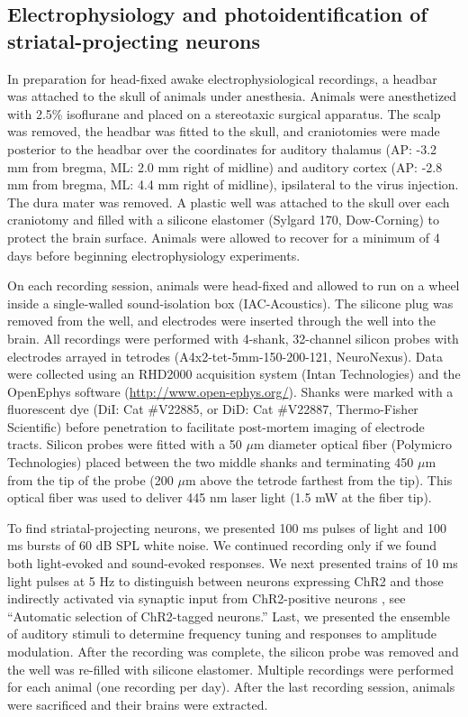 \subsection{Electrophysiology and photoidentification of striatal-projecting neurons}
%
In preparation for head-fixed awake electrophysiological recordings, a headbar was attached to the skull of animals under anesthesia.
%
Animals were anesthetized with 2.5\% isoflurane and placed on a stereotaxic surgical apparatus. 
%
The scalp was removed, the headbar was fitted to the skull, and craniotomies were made posterior to the headbar over the coordinates for auditory thalamus (AP: -3.2 mm from bregma, ML: 2.0 mm right of midline) and auditory cortex (AP: -2.8 mm from bregma, ML: 4.4 mm right of midline), ipsilateral to the virus injection.
%
The dura mater was removed. 
%
A plastic well was attached to the skull over each craniotomy and filled with a silicone elastomer (Sylgard 170, Dow-Corning) to protect the brain surface. 
%
Animals were allowed to recover for a minimum of 4 days before beginning electrophysiology experiments.

On each recording session, animals were head-fixed and allowed to run on a wheel inside a single-walled sound-isolation box (IAC-Acoustics). 
%
The silicone plug was removed from the well, and electrodes were inserted through the well into the brain. 
%
All recordings were performed with 4-shank, 32-channel silicon probes with electrodes arrayed in tetrodes (A4x2-tet-5mm-150-200-121, NeuroNexus). 
%
Data were collected using an RHD2000 acquisition system (Intan Technologies) and the OpenEphys software (\url{http://www.open-ephys.org/}).
%
Shanks were marked with a fluorescent dye (DiI: Cat \#V22885, or DiD: Cat \#V22887, Thermo-Fisher Scientific) before penetration to facilitate post-mortem imaging of electrode tracts. 
%
Silicon probes were fitted with a 50 $\mu$m diameter optical fiber (Polymicro Technologies) placed between the two middle shanks and terminating 450 $\mu$m from the tip of the probe (200 $\mu$m above the tetrode farthest from the tip). 
%
This optical fiber was used to deliver 445 nm laser light (1.5 mW at the fiber tip).

To find striatal-projecting neurons, we presented 100 ms pulses of light and 100 ms bursts of 60 dB SPL white noise. 
%
We continued recording only if we found both light-evoked and sound-evoked responses. 
%
We next presented trains of 10 ms light pulses at 5 Hz to distinguish between neurons expressing ChR2 and those indirectly activated via synaptic input from ChR2-positive neurons \citep{Lima2009}, see ``Automatic selection of ChR2-tagged neurons.''
%
Last, we presented the ensemble of auditory stimuli to determine frequency tuning and responses to amplitude modulation. 
%
After the recording was complete, the silicon probe was removed and the well was re-filled with silicone elastomer. 
%
Multiple recordings were performed for each animal (one recording per day). 
%
After the last recording session, animals were sacrificed and their brains were extracted.

